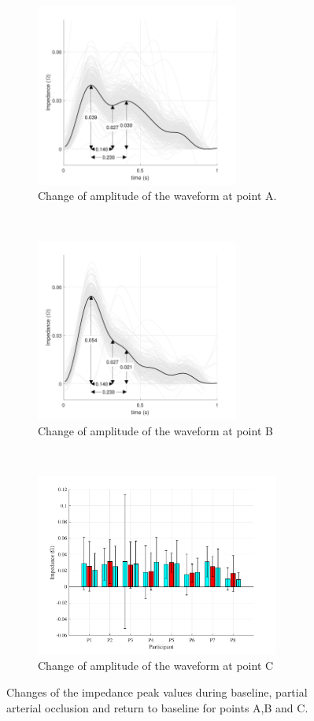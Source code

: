 \begin{figure}[t!]
	\centering
	\begin{subfigure}[t]{0.5\textwidth}
		\centering
		\includegraphics[height=6cm,keepaspectratio]{figure8a}    
		\caption{Change of amplitude of the waveform at point A.}
		\label{fig:change_A_arterial}
	\end{subfigure}%
	~ 
	\begin{subfigure}[t]{0.5\textwidth}
		\centering
		\includegraphics[height=6cm,keepaspectratio,keepaspectratio]{figure8b}    
		\caption{Change of amplitude of the waveform at point B}
		\label{fig:change_B_arterial}
	\end{subfigure}
	~
	\begin{subfigure}[t]{0.5\textwidth}
		\centering
		\includegraphics[height=6cm,keepaspectratio]{figure8c}    
		\caption{Change of amplitude of the waveform at point C}
		\label{fig:change_C_arterial}
	\end{subfigure}%
	\caption{Changes of the impedance peak values during baseline, partial arterial occlusion and return to baseline for points A,B and C.}
	\label{fig:iPG_change_points_arterial}
\end{figure}

